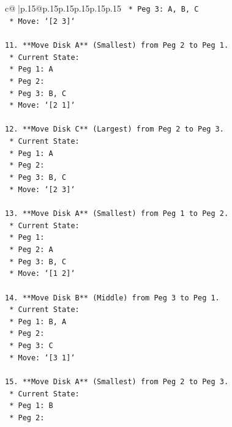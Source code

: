 \documentclass{article}
\begin{document}
{\begin{supertabular}{c@{$\;$}|p{.15\linewidth}@{}p{.15\linewidth}p{.15\linewidth}p{.15\linewidth}p{.15\linewidth}p{.15\linewidth}}
{{{\texttt{        *   Peg 3: A, B, C} \\
\texttt{    *   Move: `{[}2 3{]}`} \\
\\ 
\texttt{11. **Move Disk A** (Smallest) from Peg 2 to Peg 1.} \\
\texttt{    *   Current State:} \\
\texttt{        *   Peg 1: A} \\
\texttt{        *   Peg 2:} \\
\texttt{        *   Peg 3: B, C} \\
\texttt{    *   Move: `{[}2 1{]}`} \\
\\ 
\texttt{12. **Move Disk C** (Largest) from Peg 2 to Peg 3.} \\
\texttt{    *   Current State:} \\
\texttt{        *   Peg 1: A} \\
\texttt{        *   Peg 2:} \\
\texttt{        *   Peg 3: B, C} \\
\texttt{    *   Move: `{[}2 3{]}`} \\
\\ 
\texttt{13. **Move Disk A** (Smallest) from Peg 1 to Peg 2.} \\
\texttt{    *   Current State:} \\
\texttt{        *   Peg 1:} \\
\texttt{        *   Peg 2: A} \\
\texttt{        *   Peg 3: B, C} \\
\texttt{    *   Move: `{[}1 2{]}`} \\
\\ 
\texttt{14. **Move Disk B** (Middle) from Peg 3 to Peg 1.} \\
\texttt{    *   Current State:} \\
\texttt{        *   Peg 1: B, A} \\
\texttt{        *   Peg 2:} \\
\texttt{        *   Peg 3: C} \\
\texttt{    *   Move: `{[}3 1{]}`} \\
\\ 
\texttt{15. **Move Disk A** (Smallest) from Peg 2 to Peg 3.} \\
\texttt{    *   Current State:} \\
\texttt{        *   Peg 1: B} \\
\texttt{        *   Peg 2:} \\
}}}
\end{supertabular}}
\end{document}
